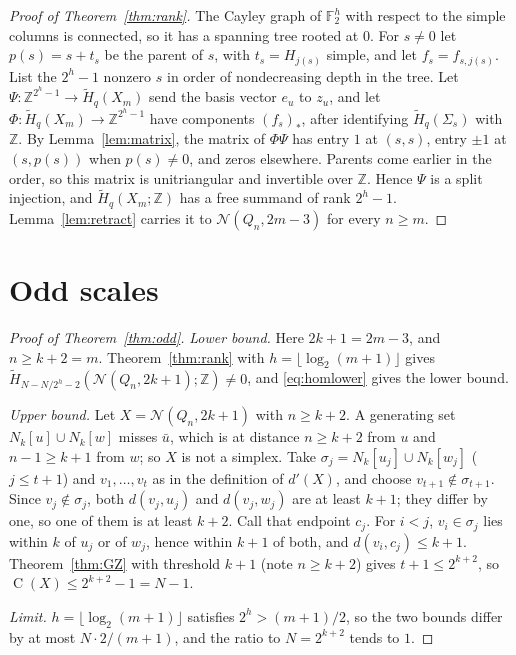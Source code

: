 \documentclass[11pt]{amsart}
\theoremstyle{definition}
\theoremstyle{remark}
\newcommand{\N}{\mathcal{N}}
\newcommand{\Q}{Q}
\newcommand{\F}{\mathbb{F}}
\newcommand{\Z}{\mathbb{Z}}
\newcommand{\Hred}{\widetilde{H}}
\newcommand{\cl}[2]{N_{#1}[#2]}
\newcommand{\C}{\operatorname{C}}
\begin{document}
\begin{proof}[Proof of Theorem~\ref{thm:rank}]
The Cayley graph of $\F_2^h$ with respect to the simple columns is connected, so it has a spanning tree rooted at $0$.
For $s\ne0$ let $p(s)=s+t_s$ be the parent of $s$, with $t_s=H_{j(s)}$ simple, and let $f_s=f_{s,j(s)}$. List the
$2^h-1$ nonzero $s$ in order of nondecreasing depth in the tree. Let $\Psi\colon\Z^{2^h-1}\to\Hred_q(X_m)$ send the basis vector
$e_u$ to $z_u$, and let $\Phi\colon\Hred_q(X_m)\to\Z^{2^h-1}$ have components $(f_s)_*$, after identifying
$\Hred_q(\Sigma_s)$ with $\Z$. By Lemma~\ref{lem:matrix}, the matrix of $\Phi\Psi$ has entry $1$ at $(s,s)$, entry $\pm1$
at $(s,p(s))$ when $p(s)\ne0$, and zeros elsewhere. Parents come earlier in the order, so this matrix is unitriangular
and invertible over $\Z$. Hence $\Psi$ is a split injection, and $\Hred_q(X_m;\Z)$ has a free summand of rank $2^h-1$.
Lemma~\ref{lem:retract} carries it to $\N(\Q_n,2m-3)$ for every $n\ge m$.
\end{proof}

\section{Odd scales}

\begin{proof}[Proof of Theorem~\ref{thm:odd}]
\emph{Lower bound.} Here $2k+1=2m-3$, and $n\ge k+2=m$. Theorem~\ref{thm:rank} with $h=\lfloor\log_2(m+1)\rfloor$ gives
$\Hred_{N-N/2^h-2}(\N(\Q_n,2k+1);\Z)\ne0$, and \eqref{eq:homlower} gives the lower bound.

\emph{Upper bound.} Let $X=\N(\Q_n,2k+1)$ with $n\ge k+2$. A generating set $\cl{k}{u}\cup\cl{k}{w}$ misses $\bar u$,
which is at distance $n\ge k+2$ from $u$ and $n-1\ge k+1$ from $w$; so $X$ is not a simplex. Take
$\sigma_j=\cl{k}{u_j}\cup\cl{k}{w_j}$ ($j\le t+1$) and $v_1,\dots,v_t$ as in the definition of $d'(X)$, and choose
$v_{t+1}\notin\sigma_{t+1}$. Since $v_j\notin\sigma_j$, both $d(v_j,u_j)$ and $d(v_j,w_j)$ are at least $k+1$; they
differ by one, so one of them is at least $k+2$. Call that endpoint $c_j$. For $i<j$, $v_i\in\sigma_j$ lies within $k$
of $u_j$ or of $w_j$, hence within $k+1$ of both, and $d(v_i,c_j)\le k+1$. Theorem~\ref{thm:GZ} with threshold $k+1$
(note $n\ge k+2$) gives $t+1\le2^{k+2}$, so $\C(X)\le2^{k+2}-1=N-1$.

\emph{Limit.} $h=\lfloor\log_2(m+1)\rfloor$ satisfies $2^{h}>(m+1)/2$, so the two bounds differ by at most
$N\cdot 2/(m+1)$, and the ratio to $N=2^{k+2}$ tends to $1$.
\end{proof}
\end{document}
